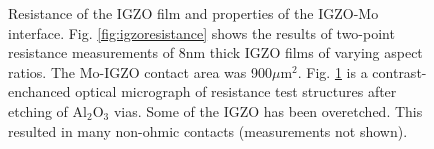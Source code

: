 \documentclass[conference]{IEEEtran}
\begin{document}
\begin{figure}[h!]
{        \label{fig:overetch}
    }
    \caption{Resistance of the IGZO film and properties of the IGZO-Mo interface. Fig. \ref{fig:igzoresistance} shows the results of two-point resistance measurements of 8nm thick IGZO films of varying aspect ratios. The Mo-IGZO contact area was 900$\mu$m$^2$. Fig. \ref{fig:overetch} is a contrast-enchanced optical micrograph of resistance test structures after etching of Al$_2$O$_3$ vias. Some of the IGZO has been overetched. This resulted in many non-ohmic contacts (measurements not shown).}
\end{figure}

\begin{figure}[htbp]
    \centering
    \quad
    \par

\end{figure}
\end{document}
